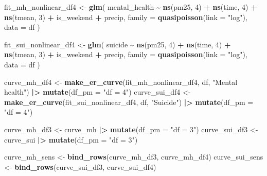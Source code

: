 \documentclass[
]{article}
\newenvironment{Shaded}{\begin{snugshade}}{\end{snugshade}}
\newcommand{\AttributeTok}[1]{\textcolor[rgb]{0.13,0.29,0.53}{#1}}
\newcommand{\DecValTok}[1]{\textcolor[rgb]{0.00,0.00,0.81}{#1}}
\newcommand{\FunctionTok}[1]{\textcolor[rgb]{0.13,0.29,0.53}{\textbf{#1}}}
\newcommand{\NormalTok}[1]{#1}
\newcommand{\OtherTok}[1]{\textcolor[rgb]{0.56,0.35,0.01}{#1}}
\newcommand{\SpecialCharTok}[1]{\textcolor[rgb]{0.81,0.36,0.00}{\textbf{#1}}}
\newcommand{\StringTok}[1]{\textcolor[rgb]{0.31,0.60,0.02}{#1}}
\begin{document}
\begin{Shaded}
\begin{Highlighting}[]
\NormalTok{fit\_mh\_nonlinear\_df4 }\OtherTok{\textless{}{-}} \FunctionTok{glm}\NormalTok{(}
\NormalTok{  mental\_health }\SpecialCharTok{\textasciitilde{}} \FunctionTok{ns}\NormalTok{(pm25, }\DecValTok{4}\NormalTok{) }\SpecialCharTok{+} \FunctionTok{ns}\NormalTok{(time, }\DecValTok{4}\NormalTok{) }\SpecialCharTok{+} \FunctionTok{ns}\NormalTok{(tmean, }\DecValTok{3}\NormalTok{) }\SpecialCharTok{+}\NormalTok{ is\_weekend }\SpecialCharTok{+}\NormalTok{ precip,}
  \AttributeTok{family =} \FunctionTok{quasipoisson}\NormalTok{(}\AttributeTok{link =} \StringTok{"log"}\NormalTok{),}
  \AttributeTok{data =}\NormalTok{ df}
\NormalTok{)}

\NormalTok{fit\_sui\_nonlinear\_df4 }\OtherTok{\textless{}{-}} \FunctionTok{glm}\NormalTok{(}
\NormalTok{  suicide }\SpecialCharTok{\textasciitilde{}} \FunctionTok{ns}\NormalTok{(pm25, }\DecValTok{4}\NormalTok{) }\SpecialCharTok{+} \FunctionTok{ns}\NormalTok{(time, }\DecValTok{4}\NormalTok{) }\SpecialCharTok{+} \FunctionTok{ns}\NormalTok{(tmean, }\DecValTok{3}\NormalTok{) }\SpecialCharTok{+}\NormalTok{ is\_weekend }\SpecialCharTok{+}\NormalTok{ precip,}
  \AttributeTok{family =} \FunctionTok{quasipoisson}\NormalTok{(}\AttributeTok{link =} \StringTok{"log"}\NormalTok{),}
  \AttributeTok{data =}\NormalTok{ df}
\NormalTok{)}

\NormalTok{curve\_mh\_df4  }\OtherTok{\textless{}{-}} \FunctionTok{make\_er\_curve}\NormalTok{(fit\_mh\_nonlinear\_df4, df, }\StringTok{"Mental health"}\NormalTok{) }\SpecialCharTok{|\textgreater{}} \FunctionTok{mutate}\NormalTok{(}\AttributeTok{df\_pm =} \StringTok{"df = 4"}\NormalTok{)}
\NormalTok{curve\_sui\_df4 }\OtherTok{\textless{}{-}} \FunctionTok{make\_er\_curve}\NormalTok{(fit\_sui\_nonlinear\_df4, df, }\StringTok{"Suicide"}\NormalTok{) }\SpecialCharTok{|\textgreater{}} \FunctionTok{mutate}\NormalTok{(}\AttributeTok{df\_pm =} \StringTok{"df = 4"}\NormalTok{)}

\NormalTok{curve\_mh\_df3  }\OtherTok{\textless{}{-}}\NormalTok{ curve\_mh  }\SpecialCharTok{|\textgreater{}} \FunctionTok{mutate}\NormalTok{(}\AttributeTok{df\_pm =} \StringTok{"df = 3"}\NormalTok{)}
\NormalTok{curve\_sui\_df3 }\OtherTok{\textless{}{-}}\NormalTok{ curve\_sui }\SpecialCharTok{|\textgreater{}} \FunctionTok{mutate}\NormalTok{(}\AttributeTok{df\_pm =} \StringTok{"df = 3"}\NormalTok{)}

\NormalTok{curve\_mh\_sens  }\OtherTok{\textless{}{-}} \FunctionTok{bind\_rows}\NormalTok{(curve\_mh\_df3, curve\_mh\_df4)}
\NormalTok{curve\_sui\_sens }\OtherTok{\textless{}{-}} \FunctionTok{bind\_rows}\NormalTok{(curve\_sui\_df3, curve\_sui\_df4)}
\end{Highlighting}
\end{Shaded}
\end{document}
